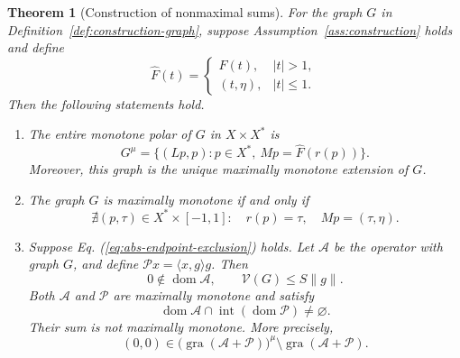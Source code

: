\documentclass[11pt]{article}
\newcommand{\gra}{\operatorname{gra}}
\newcommand{\dom}{\operatorname{dom}}
\newcommand{\pair}[2]{\langle #1,#2\rangle}
\newtheorem{theorem}{Theorem}
\theoremstyle{definition}
\theoremstyle{remark}
\begin{document}
\begin{theorem}[Construction of nonmaximal sums]
\label{thm:endpoint-criterion}
For the graph $G$ in Definition~\ref{def:construction-graph}, suppose Assumption~\ref{ass:construction} holds and define
\[
\widehat F(t)=
\begin{cases}
F(t),&|t|>1,\\
(t,\eta),&|t|\le1.
\end{cases}
\]
Then the following statements hold.
\begin{enumerate}
\renewcommand{\theenumi}{\roman{enumi}}
\renewcommand{\labelenumi}{(\theenumi)}
\item\label{thm:polar-part} The entire monotone polar of $G$ in $X\times X^*$ is
\begin{equation}
G^\mu=\{(Lp,p):p\in X^*,\ Mp=\widehat F(r(p))\}.
\label{eq:abs-entire-polar}
\end{equation}
Moreover, this graph is the unique maximally monotone extension of $G$.

\item\label{thm:maximality-part} The graph $G$ is maximally monotone if and only if
\begin{equation}
\nexists(p,\tau)\in X^*\times[-1,1]:
\quad r(p)=\tau,\quad Mp=(\tau,\eta).
\label{eq:abs-endpoint-exclusion}
\end{equation}

\item\label{thm:sum-part} Suppose Eq. (\ref{eq:abs-endpoint-exclusion}) holds.
Let $\mathcal A$ be the operator with graph $G$, and define $\mathcal P x=\pair{x}{g}g$. Then
\[
0\notin\dom\mathcal A,\qquad \mathcal V(G)\le S\|g\|.
\]
Both $\mathcal A$ and $\mathcal P$ are maximally monotone and satisfy
\[
\dom\mathcal A\cap\operatorname{int}(\dom\mathcal P)\ne\varnothing.
\]
Their sum is not maximally monotone. More precisely,
\[
(0,0)\in
\bigl(\gra(\mathcal A+\mathcal P)\bigr)^\mu
\setminus\gra(\mathcal A+\mathcal P).
\]
\end{enumerate}
\end{theorem}
\end{document}
